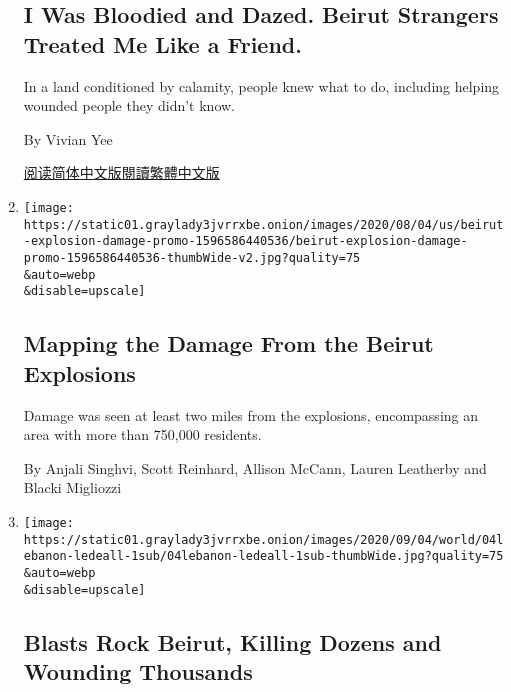 \begin{enumerate}
{  \subsection{I Was Bloodied and Dazed. Beirut Strangers Treated Me Like
  a
  Friend.}\label{i-was-bloodied-and-dazed-beirut-strangers-treated-me-like-a-friend}}

  In a land conditioned by calamity, people knew what to do, including
  helping wounded people they didn't know.

  By Vivian Yee

  \href{https://cn.nytimes3xbfgragh.onion/world/20200805/beirut-explosion-first-person/}{阅读简体中文版}\href{https://cn.nytimes3xbfgragh.onion/world/20200805/beirut-explosion-first-person/zh-hant/}{閱讀繁體中文版}
\item
  \href{/interactive/2020/08/04/world/middleeast/beirut-explosion-damage.html}{}

  \texttt{[image: https://static01.graylady3jvrrxbe.onion/images/2020/08/04/us/beirut-explosion-damage-promo-1596586440536/beirut-explosion-damage-promo-1596586440536-thumbWide-v2.jpg?quality=75\\\&auto=webp\\\&disable=upscale]}

  \hypertarget{mapping-the-damage-from-the-beirut-explosions}{%
  \subsection{Mapping the Damage From the Beirut
  Explosions}\label{mapping-the-damage-from-the-beirut-explosions}}

  Damage was seen at least two miles from the explosions, encompassing
  an area with more than 750,000 residents.

  By Anjali Singhvi, Scott Reinhard, Allison McCann, Lauren Leatherby
  and Blacki Migliozzi
\item
  \href{/2020/08/04/world/middleeast/lebanon-explosion.html}{}

  \texttt{[image: https://static01.graylady3jvrrxbe.onion/images/2020/09/04/world/04lebanon-ledeall-1sub/04lebanon-ledeall-1sub-thumbWide.jpg?quality=75\\\&auto=webp\\\&disable=upscale]}

  \hypertarget{blasts-rock-beirut-killing-dozens-and-wounding-thousands}{%
  \subsection{Blasts Rock Beirut, Killing Dozens and Wounding
  Thousands}\label{blasts-rock-beirut-killing-dozens-and-wounding-thousands}}


\end{enumerate}
